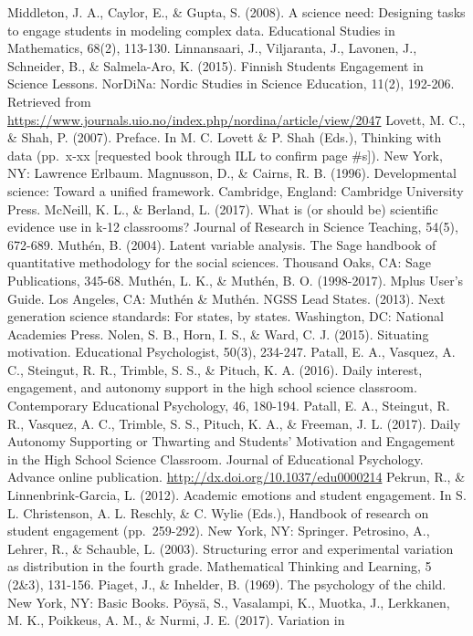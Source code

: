 \documentclass[]{book}
\theoremstyle{definition}
\theoremstyle{definition}
\theoremstyle{definition}
\theoremstyle{remark}
\begin{document}
Middleton, J. A., Caylor, E., \& Gupta, S. (2008). A science need:
Designing tasks to engage students in modeling complex data. Educational
Studies in Mathematics, 68(2), 113-130. Linnansaari, J., Viljaranta, J.,
Lavonen, J., Schneider, B., \& Salmela-Aro, K. (2015). Finnish Students
Engagement in Science Lessons. NorDiNa: Nordic Studies in Science
Education, 11(2), 192-206. Retrieved from
\url{https://www.journals.uio.no/index.php/nordina/article/view/2047}
Lovett, M. C., \& Shah, P. (2007). Preface. In M. C. Lovett \& P. Shah
(Eds.), Thinking with data (pp.~x-xx {[}requested book through ILL to
confirm page \#s{]}). New York, NY: Lawrence Erlbaum. Magnusson, D., \&
Cairns, R. B. (1996). Developmental science: Toward a unified framework.
Cambridge, England: Cambridge University Press. McNeill, K. L., \&
Berland, L. (2017). What is (or should be) scientific evidence use in
k‐12 classrooms? Journal of Research in Science Teaching, 54(5),
672-689. Muthén, B. (2004). Latent variable analysis. The Sage handbook
of quantitative methodology for the social sciences. Thousand Oaks, CA:
Sage Publications, 345-68. Muthén, L. K., \& Muthén, B. O. (1998-2017).
Mplus User's Guide. Los Angeles, CA: Muthén \& Muthén. NGSS Lead States.
(2013). Next generation science standards: For states, by states.
Washington, DC: National Academies Press. Nolen, S. B., Horn, I. S., \&
Ward, C. J. (2015). Situating motivation. Educational Psychologist,
50(3), 234-247. Patall, E. A., Vasquez, A. C., Steingut, R. R., Trimble,
S. S., \& Pituch, K. A. (2016). Daily interest, engagement, and autonomy
support in the high school science classroom. Contemporary Educational
Psychology, 46, 180-194. Patall, E. A., Steingut, R. R., Vasquez, A. C.,
Trimble, S. S., Pituch, K. A., \& Freeman, J. L. (2017). Daily Autonomy
Supporting or Thwarting and Students' Motivation and Engagement in the
High School Science Classroom. Journal of Educational Psychology.
Advance online publication. \url{http://dx.doi.org/10.1037/edu0000214}
Pekrun, R., \& Linnenbrink-Garcia, L. (2012). Academic emotions and
student engagement. In S. L. Christenson, A. L. Reschly, \& C. Wylie
(Eds.), Handbook of research on student engagement (pp.~259-292). New
York, NY: Springer. Petrosino, A., Lehrer, R., \& Schauble, L. (2003).
Structuring error and experimental variation as distribution in the
fourth grade. Mathematical Thinking and Learning, 5 (2\&3), 131-156.
Piaget, J., \& Inhelder, B. (1969). The psychology of the child. New
York, NY: Basic Books. Pöysä, S., Vasalampi, K., Muotka, J., Lerkkanen,
M. K., Poikkeus, A. M., \& Nurmi, J. E. (2017). Variation in
\end{document}
